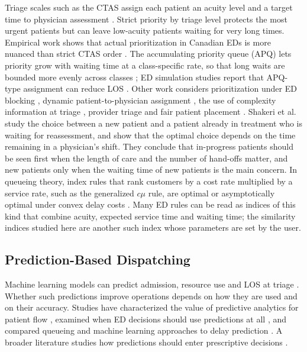 Triage scales such as the CTAS assign each patient an acuity level and a target time to physician assessment \cite{Bullard2017_CTAS}. Strict priority by triage level protects the most urgent patients but can leave low-acuity patients waiting for very long times. Empirical work shows that actual prioritization in Canadian EDs is more nuanced than strict CTAS order \cite{Prioritization_Using_CTAS}. The accumulating priority queue (APQ) lets priority grow with waiting time at a class-specific rate, so that long waits are bounded more evenly across classes \cite{StanfordTaylorZiedins2014_APQ}; ED simulation studies report that APQ-type assignment can reduce LOS \cite{Vanbrabant2021}. Other work considers prioritization under ED blocking \cite{Li_etal_2023-Who-Is-Next}, dynamic patient-to-physician assignment \cite{Dynamic_scheduling_ED2023EJOR}, the use of complexity information at triage \cite{Saghafian2014_Complexity-Augmented_Triage}, provider triage \cite{Provider_Triage_Management_Science_2019} and fair patient placement \cite{POM_Patient_PlacementInED_2024}. Shakeri et al.\ \cite{Shakeri2025_WhoToSeeNext} study the choice between a new patient and a patient already in treatment who is waiting for reassessment, and show that the optimal choice depends on the time remaining in a physician's shift. They conclude that in-progress patients should be seen first when the length of care and the number of hand-offs matter, and new patients only when the waiting time of new patients is the main concern. In queueing theory, index rules that rank customers by a cost rate multiplied by a service rate, such as the generalized $c\mu$ rule, are optimal or asymptotically optimal under convex delay costs \cite{VanMieghem1995_GenCMu,Mandelbaum2004_GenCMu}. Many ED rules can be read as indices of this kind that combine acuity, expected service time and waiting time; the similarity indices studied here are another such index whose parameters are set by the user.

\subsection{Prediction-Based Dispatching}

Machine learning models can predict admission, resource use and LOS at triage \cite{Hong2018_disposition,SUN2011_disposition,Azari2015_LongLOS}. Whether such predictions improve operations depends on how they are used and on their accuracy. Studies have characterized the value of predictive analytics for patient flow \cite{Peck_2014_value_of_predictive_analytics}, examined when ED decisions should use predictions at all \cite{POM_To_Predict_or_Not_2022}, and compared queueing and machine learning approaches to delay prediction \cite{Chocron2024DelayPrediction}. A broader literature studies how predictions should enter prescriptive decisions \cite{BertsimasKallus2020_Prescriptive,ElmachtoubGrigas2022_SPO}.

